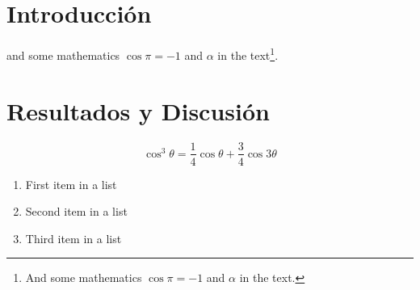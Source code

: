 \documentclass[fleqn,10pt]{SelfArx}
\begin{document}
\flushbottom %

\maketitle %


\thispagestyle{empty} %


\section*{Introducci\'on} %


\lipsum[1-3] %
and some mathematics $\cos\pi=-1$ and $\alpha$ in the text\footnote{And some mathematics $\cos\pi=-1$ and $\alpha$ in the text.}.


\section{Resultados y Discusi\'on}

\lipsum[4] %

\begin{equation}
\cos^3 \theta =\frac{1}{4}\cos\theta+\frac{3}{4}\cos 3\theta
\label{eq:refname2}
\end{equation}

\lipsum[5] %

\begin{enumerate}[noitemsep] %
\item First item in a list
\item Second item in a list
\item Third item in a list
\end{enumerate}
\end{document}
